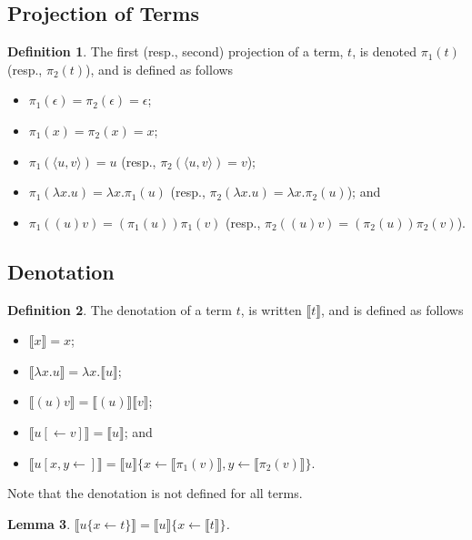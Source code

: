 \documentclass[11pt,a4paper]{article}
\theoremstyle{definition}
\newtheorem{definition}{Definition}
\theoremstyle{plain}
\newtheorem{lemma}[definition]{Lemma}
\theoremstyle{remark}
\begin{document}
\subsection{Projection of Terms}

\begin{definition}
The first (resp., second) projection of a term, $t$, is denoted $\pi_1(t)$ (resp., $\pi_2(t)$), and is defined as follows
\begin{itemize}
	\item $\pi_1(\epsilon)=\pi_2(\epsilon)=\epsilon$;
	\item $\pi_1(x)=\pi_2(x)=x$;
	\item $\pi_1(\langle u,v\rangle)=u$ (resp., $\pi_2(\langle u,v\rangle)=v$);
	\item $\pi_1(\lambda x.u)=\lambda x.\pi_1(u)$ (resp., $\pi_2(\lambda x.u)=\lambda x.\pi_2(u)$); and
	\item $\pi_1( (u)v)=(\pi_1(u))\pi_1(v)$ (resp., $\pi_2( (u)v)=(\pi_2(u))\pi_2(v)$).
\end{itemize}
\end{definition}

\subsection{Denotation}

\begin{definition}
The denotation of a term $t$, is written $\llbracket t\rrbracket$, and is defined as follows
\begin{itemize}
	\item $\llbracket x \rrbracket=x$;
	\item $\llbracket \lambda x. u\rrbracket =\lambda x.\llbracket u\rrbracket$;
	\item $\llbracket (u)v\rrbracket = \llbracket(u)\rrbracket\llbracket v\rrbracket$;
	\item $\llbracket u[\leftarrow v]\rrbracket=\llbracket u\rrbracket$; and
	\item $\llbracket u[x,y\leftarrow]\rrbracket=\llbracket u\rrbracket\{x\leftarrow \llbracket\pi_1(v)\rrbracket,y\leftarrow\llbracket\pi_2(v)\rrbracket\}$.
\end{itemize}
\end{definition}

Note that the denotation is not defined for all terms.

\begin{lemma}
$\llbracket u\{x\leftarrow t\}\rrbracket=\llbracket u\rrbracket\{x\leftarrow\llbracket t\rrbracket\}$.
\end{lemma}
\end{document}
